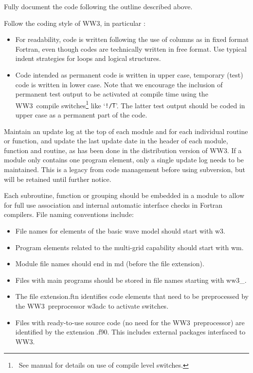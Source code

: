 \documentclass[12pt]{article}
\newcommand{\ws}{WW3}
\newcommand{\file}{\sf}
\newcommand{\code}{\tt}
\newcounter{mylistno}
\begin{document}
\begin{list}{)}{ \rightmargin 8mm
                                \leftmargin 10mm }

\item Fully document the code following the outline described above.

\item Follow the coding style of \ws, in particular :

\begin{itemize}
\item For readability, code is written following the use of columns as in
      fixed format Fortran, even though codes are technically written in free
      format. Use typical indent strategies for loops and logical structures.
\item Code intended as permanent code is written in upper case, temporary
      (test) code is written in lower case. Note that we encourage the
      inclusion of permanent test output to be activated at compile time using
      the \ws\ compile switches\footnote{~See manual for details on use of
      compile level switches.} like `{\code !/T}'. The latter test output
      should be coded in upper case as a permanent part of the code.
\end{itemize}

\item Maintain an update log at the top of each module and for each individual
      routine or function, and update the last update date in the header of
      each module, function and routine, as has been done in the distribution
      version of \ws. If a module only contains one program element, only a
      single update log needs to be maintained. This is a legacy from code
      management before using subversion, but will be retained until further
      notice.

\item Each subroutine, function or grouping should be embedded in a module to
      allow for full use association and internal automatic interface checks
      in Fortran compilers. File naming conventions include:

\begin{itemize}
\item File names for elements of the basic wave model should start with {\file
      w3}.
\item Program elements related to the multi-grid capability should start with
      {\file wm}.
\item Module file names should end in {\file md} (before the file extension).
\item Files with main programs should be stored in file names starting with
      {\file ww3\_}.
\item The file extension{\file .ftn} identifies code elements that need to be
      preprocessed by the \ws\ preprocessor {\file w3adc} to activate
      switches.
\item Files with ready-to-use source code (no need for the \ws\ preprocessor)
      are identified by the extension {\file .f90}. This includes external
      packages interfaced to \ws.
\end{itemize}


\end{list}
\end{document}
